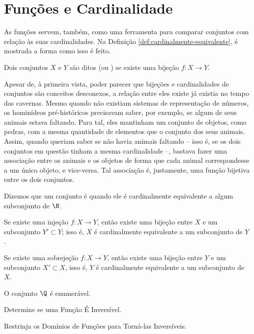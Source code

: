 \section{Funções e Cardinalidade}

As funções servem, também, como uma ferramenta para comparar conjuntos com relação às suas cardinalidades.
Na Definição \ref{def:cardinalmente-equivalente}, é mostrada a forma como isso é feito.

\begin{definition}
\label{def:cardinalmente-equivalente}
Dois conjuntos $X$ e $Y$ são ditos 
(ou ) se existe uma bijeção $f : X \to Y$.
\end{definition}

Apesar de, à primeira vista, poder parecer que bijeções e cardinalidades de conjuntos são conceitos desconexos, a relação entre eles existe já existia no tempo das cavernas.
Mesmo quando não existiam sistemas de representação de números, os hominídeos pré-históricos precisavam saber, por exemplo, se algum de seus animais estava faltando. 
Para tal, eles mantinham um conjunto de objetos, como pedras, com a mesma quantidade de elementos que o conjunto dos seus animais.
Assim, quando queriam saber se não havia animais faltando -- isso é, se os dois conjuntos em questão tinham a mesma cardinalidade --, bastava fazer uma associação entre os animais e os objetos de forma que cada animal correspondesse a um único objeto, e vice-versa.
Tal associação é, justamente, uma função bijetiva entre os dois conjuntos.

\begin{definition}
Dizemos que um conjunto é  quando ele é cardinalmente equivalente a algum subconjunto de $\N$.
\end{definition}

\begin{theorem}
Se existe uma injeção $f: X \to Y$, então existe uma bijeção entre $X$ e um subconjunto $Y' \subset Y$; isso é, $X$ é cardinalmente
equivalente a um subconjunto de $Y$.
\end{theorem}

\begin{theorem}
Se existe uma sobrejeção $f : X \to Y$, então existe uma bijeção entre $Y$ e um subconjunto $X' \subset X$, isso é, $Y$ é
cardinalmente equivalente a um subconjunto de $X$.
\end{theorem}

\begin{example}
    O conjunto $\Q$ é enumerável.
\end{example}

\begin{onlineact}
    {Determine se uma Função É Inversível}.
\end{onlineact}

\begin{onlineact}
    {Restrinja os Domínios de Funções para Torná-las Inversíveis}.
\end{onlineact}